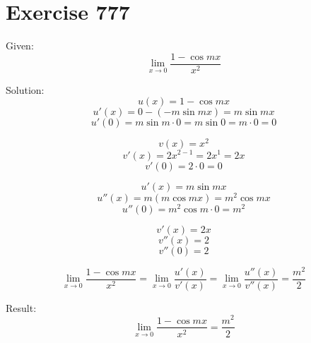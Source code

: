 \documentclass[a4paper, 10pt]{scrartcl}
\begin{document}
\section{Exercise 777}

Given:
\[
\lim_{x\to 0}{\frac{1 - \cos{mx}}{x^{2}}}
\]

Solution:
\[
u(x) = 1 - \cos{mx}
\]
\[
u'(x) = 0 - (-m\sin{mx}) = m\sin{mx}
\]
\[
u'(0) = m\sin{m\cdot 0} = m\sin{0} = m\cdot 0 = 0
\]

\[
v(x) = x^{2}
\]
\[
v'(x) = 2x^{2 - 1} = 2x^{1} = 2x
\]
\[
v'(0) = 2\cdot 0 = 0
\]

\[
u'(x) = m\sin{mx}
\]
\[
u''(x) = m(m\cos{mx}) = m^{2}\cos{mx}
\]
\[
u''(0) = m^{2}\cos{m\cdot 0} = m^{2}
\]

\[
v'(x) = 2x
\]
\[
v''(x) = 2
\]
\[
v''(0) = 2
\]

\[
\lim_{x\to 0}{\frac{1 - \cos{mx}}{x^{2}}} = \lim_{x\to 0}{\frac{u'(x)}{v'(x)}} = \lim_{x\to 0}{\frac{u''(x)}{v''(x)}}
= \frac{m^{2}}{2}
\]

Result:
\[
\lim_{x\to 0}{\frac{1 - \cos{mx}}{x^{2}}} = \frac{m^{2}}{2}
\]
\end{document}
